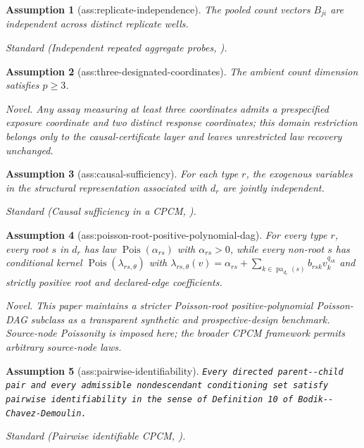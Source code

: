 \documentclass{article}
\newtheorem{assumption}{Assumption}
\begin{document}
\begin{assumption}[ass:replicate-independence]\label{ass:replicate-independence}
The pooled count vectors \(B_{ji}\) are independent across distinct replicate wells.
\par\smallskip\noindent\emph{Standard} (Independent repeated aggregate probes, \cite{ShihHero2001Unicast}).
\end{assumption}

\begin{assumption}[ass:three-designated-coordinates]\label{ass:three-designated-coordinates}
The ambient count dimension satisfies \(p\geq3\).
\par\smallskip\noindent\emph{Novel.} Any assay measuring at least three coordinates admits a prespecified exposure coordinate and two distinct response coordinates; this domain restriction belongs only to the causal-certificate layer and leaves unrestricted law recovery unchanged.
\end{assumption}

\begin{assumption}[ass:causal-sufficiency]\label{ass:causal-sufficiency}
For each type \(r\), the exogenous variables in the structural representation associated with \(d_r\) are jointly independent.
\par\smallskip\noindent\emph{Standard} (Causal sufficiency in a CPCM, \cite{Pearl2009Causality}).
\end{assumption}

\begin{assumption}[ass:poisson-root-positive-polynomial-dag]\label{ass:poisson-root-positive-polynomial-dag}
For every type \(r\), every root \(s\) in \(d_r\) has law \(\operatorname{Pois}(\alpha_{rs})\) with \(\alpha_{rs}>0\), while every non-root \(s\) has conditional kernel \(\operatorname{Pois}(\lambda_{rs,\theta})\) with \(\lambda_{rs,\theta}(v)=\alpha_{rs}+\sum_{k\in\operatorname{pa}_{d_r}(s)}b_{rsk}v_k^{q_{sk}}\) and strictly positive root and declared-edge coefficients.
\par\smallskip\noindent\emph{Novel.} This paper maintains a stricter Poisson-root positive-polynomial Poisson-DAG subclass as a transparent synthetic and prospective-design benchmark. Source-node Poissonity is imposed here; the broader CPCM framework permits arbitrary source-node laws.
\end{assumption}

\begin{assumption}[ass:pairwise-identifiability]\label{ass:pairwise-identifiability}
\texttt{Every directed parent-\allowbreak{}-\allowbreak{}child pair and every admissible nondescendant conditioning set satisfy pairwise identifiability in the sense of Definition 10 of Bodik-\allowbreak{}-\allowbreak{}Chavez-\allowbreak{}Demoulin.}
\par\smallskip\noindent\emph{Standard} (Pairwise identifiable CPCM, \cite{BodikChavezDemoulin2025CPCM}).
\end{assumption}
\end{document}
